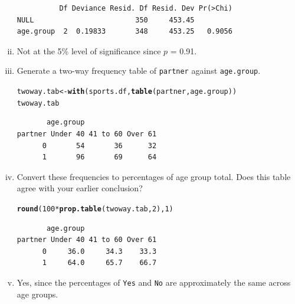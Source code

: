 \documentclass[12pt,a4paper]{article}\usepackage[]{graphicx}\usepackage[]{color}
\makeatletter
\newcommand{\hlnum}[1]{\textcolor[rgb]{0.686,0.059,0.569}{#1}}%
\newcommand{\hlopt}[1]{\textcolor[rgb]{0,0,0}{#1}}%
\newcommand{\hlstd}[1]{\textcolor[rgb]{0.345,0.345,0.345}{#1}}%
\newcommand{\hlkwb}[1]{\textcolor[rgb]{0.69,0.353,0.396}{#1}}%
\newcommand{\hlkwd}[1]{\textcolor[rgb]{0.737,0.353,0.396}{\textbf{#1}}}%
\newenvironment{kframe}{%
 \def\at@end@of@kframe{}%
 \ifinner\ifhmode%
  \def\at@end@of@kframe{\end{minipage}}%
  \begin{minipage}{\columnwidth}%
 \fi\fi%
 \def\FrameCommand##1{\hskip\@totalleftmargin \hskip-\fboxsep
 \colorbox{shadecolor}{##1}\hskip-\fboxsep
     \hskip-\linewidth \hskip-\@totalleftmargin \hskip\columnwidth}%
 \MakeFramed {\advance\hsize-\width
   \@totalleftmargin\z@ \linewidth\hsize
   \@setminipage}}%
 {\par\unskip\endMakeFramed%
 \at@end@of@kframe}
\newenvironment{knitrout}{}{} %
\makeatother
\begin{document}
\begin{enumerate}[(i)]
\begin{knitrout}
\begin{kframe}
\begin{verbatim}
          Df Deviance Resid. Df Resid. Dev Pr(>Chi)
NULL                        350     453.45         
age.group  2  0.19833       348     453.25   0.9056
\end{verbatim}
\end{kframe}
\end{knitrout}
\item[] Not at the 5\% level of significance since $p$ = 0.91.
\item Generate a two-way frequency table of \texttt{partner} against \texttt{age.group}. 
\begin{knitrout}
\color{fgcolor}\begin{kframe}
\begin{alltt}
\hlstd{twoway.tab} \hlkwb{<-} \hlkwd{with}\hlstd{(sports.df,} \hlkwd{table}\hlstd{(partner, age.group))}
\hlstd{twoway.tab}
\end{alltt}
\begin{verbatim}
       age.group
partner Under 40 41 to 60 Over 61
      0       54       36      32
      1       96       69      64
\end{verbatim}
\end{kframe}
\end{knitrout}
\item Convert these frequencies to percentages of age group total. Does this table agree with your earlier conclusion?
\begin{knitrout}
\color{fgcolor}\begin{kframe}
\begin{alltt}
\hlkwd{round}\hlstd{(}\hlnum{100}\hlopt{*}\hlkwd{prop.table}\hlstd{(twoway.tab,} \hlnum{2}\hlstd{),} \hlnum{1}\hlstd{)}
\end{alltt}
\begin{verbatim}
       age.group
partner Under 40 41 to 60 Over 61
      0     36.0     34.3    33.3
      1     64.0     65.7    66.7
\end{verbatim}
\end{kframe}
\end{knitrout}
\item[] Yes, since the percentages of \texttt{Yes} and \texttt{No} are approximately the same across age groups.
\end{enumerate}
\end{document}
